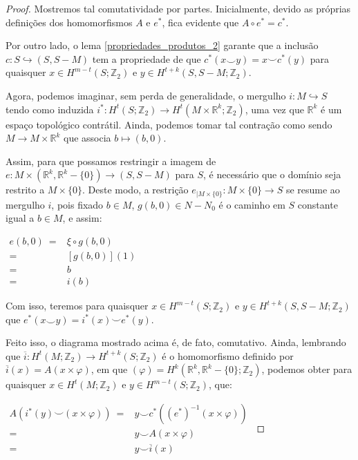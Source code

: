\documentclass[12pt,oneside]{book} %
\newcommand{\R}{\mathbb{R}}
\newcommand{\Z}{\mathbb{Z}}
\newcommand{\ccup}{\smile}
\begin{document}
\begin{proof}
	\par Mostremos tal comutatividade por partes. Inicialmente, devido as próprias definições dos homomorfismos $A$ e $e^{*}$, fica evidente que $A\circ e^{*}=c^{*}$.
	
	\par Por outro lado, o lema \ref{propriedades_produtos_2} garante que a inclusão $c:S\hookrightarrow (S,S-M)$ tem a propriedade de que $c^{*}(x\ccup y)=x\ccup c^{*}(y)$ para quaisquer $x\in H^{m-t}(S;\Z_{2})$ e $y\in H^{t+k}(S,S-M;\Z_{2})$.
	
	\par Agora, podemos imaginar, sem perda de generalidade, o mergulho $i:M\hookrightarrow S$ tendo como induzida $i^{*}:H^{t}(S;\Z_{2})\to H^{t}(M\times\R^{k};\Z_{2})$, uma vez que $\R^{k}$ é um espaço topológico contrátil. Ainda, podemos tomar tal contração como sendo $M\to M\times \R^{k}$ que associa $b\mapsto (b,0)$.
	
	\par Assim, para que possamos restringir a imagem de $e:M\times(\R^{k},\R^{k}-\{0\})\to (S,S-M)$ para $S$, é necessário que o domínio seja restrito a $M\times \{0\}$. Deste modo, a restrição $e_{|M\times\{0\}}:M\times\{0\}\to S$ se resume ao mergulho $i$, pois fixado $b\in M$, $g(b,0)\in N-N_{0}$ é o caminho em $S$ constante igual a $b\in M$, e assim:\newline
	
	$ \begin{array}{rl}
		e(b,0) \ = & \xi\circ g(b,0) \\
		= & [g(b,0)](1) \\
		= & b \\
		= & i(b)
	\end{array} $\newline
	
	\par Com isso, teremos para quaisquer $x\in H^{m-t}(S;\Z_{2})$ e $y\in H^{t+k}(S,S-M;\Z_{2})$ que $e^{*}(x\ccup y)=i^{*}(x)\ccup e^{*}(y)$.
	
	\par Feito isso, o diagrama mostrado acima é, de fato, comutativo. Ainda, lembrando que $\overline{i}:H^{t}(M;\Z_{2})\to H^{t+k}(S;\Z_{2})$ é o homomorfismo definido por $\overline{i}(x)=A(x\times \varphi)$, em que $(\varphi)=H^{k}(\R^{k},\R^{k}-\{0\};\Z_{2})$, podemos obter para quaisquer $x\in H^{t}(M;\Z_{2})$ e $y\in H^{m-t}(S;\Z_{2})$, que:\newline
	
	$ \begin{array}{rl}
		A(i^{*}(y)\ccup (x\times\varphi)) \ = & y\ccup c^{*}((e^{*})^{-1}(x\times\varphi)) \\
		= & y\ccup A(x\times\varphi) \\
		= & y\ccup \overline{i}(x)
	\end{array} $ \newline
	

\end{proof}
\end{document}
